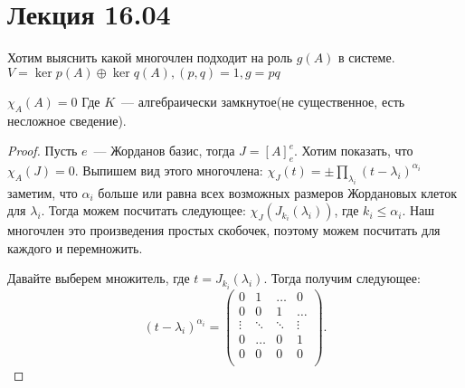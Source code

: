 \section{Лекция 16.04}
\begin{motivation}
    Хотим выяснить какой многочлен подходит на роль $g(A)$ в системе.
    $V = \ker p(A) \oplus \ker q(A), (p,q) = 1, g= pq$
\end{motivation}
\begin{theorem}
   $\chi_A(A) = 0$
   Где $K$~--- алгебраически замкнутое(не существенное, есть несложное сведение).
\end{theorem}
\begin{proof}
    Пусть $e$~--- Жорданов базис, тогда $J = [A]^e_e$.
    Хотим показать, что $\chi_A(J) = 0$.
    Выпишем вид этого многочлена: $\chi_J(t) = \pm\prod\limits_{\lambda_i}^{}{(t-\lambda_i)^{\alpha_i}}$
    заметим, что $\alpha_i$ больше или равна всех возможных размеров Жордановых клеток 
    для $\lambda_i$.
    Тогда можем посчитать следующее:
    $\chi_J(J_{k_i}(\lambda_i))$, где $k_i \le \alpha_i$.
    Наш многочлен это произведения простых скобочек, поэтому можем посчитать для
    каждого и перемножить. 

    Давайте выберем множитель, где $t= J_{k_i}(\lambda_i)$.
    Тогда получим следующее:
     \[
         (t - \lambda_i)^{\alpha_i}  = 
         \begin{pmatrix}
             0 & 1 & \dots & 0\\
             0 & 0 & 1 & \dots\\
             \vdots & \ddots & \ddots & \vdots\\
             0 & \dots & 0 & 1\\
             0 & 0 & 0 & 0\\
         \end{pmatrix}
    .\] 
\end{proof}

